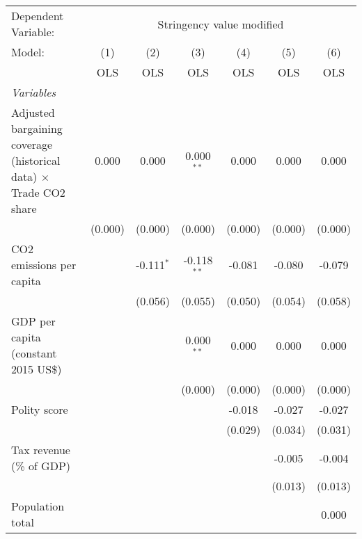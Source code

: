 
\begingroup
\centering
\begin{tabular}{lcccccc}
   \toprule
   Dependent Variable: & \multicolumn{6}{c}{Stringency value modified}\\
   Model:                                                                   & (1)     & (2)          & (3)           & (4)     & (5)     & (6)\\  
                                                                            &  OLS    & OLS          & OLS           & OLS     & OLS     & OLS\\  
   \midrule
   \emph{Variables}\\
   Adjusted bargaining coverage (historical data) $\times$ Trade CO2 share  & 0.000   & 0.000        & 0.000$^{**}$  & 0.000   & 0.000   & 0.000\\   
                                                                            & (0.000) & (0.000)      & (0.000)       & (0.000) & (0.000) & (0.000)\\   
   CO2 emissions per capita                                                 &         & -0.111$^{*}$ & -0.118$^{**}$ & -0.081  & -0.080  & -0.079\\   
                                                                            &         & (0.056)      & (0.055)       & (0.050) & (0.054) & (0.058)\\   
   GDP per capita (constant 2015 US\$)                                      &         &              & 0.000$^{**}$  & 0.000   & 0.000   & 0.000\\   
                                                                            &         &              & (0.000)       & (0.000) & (0.000) & (0.000)\\   
   Polity score                                                             &         &              &               & -0.018  & -0.027  & -0.027\\   
                                                                            &         &              &               & (0.029) & (0.034) & (0.031)\\   
   Tax revenue (\% of GDP)                                                  &         &              &               &         & -0.005  & -0.004\\   
                                                                            &         &              &               &         & (0.013) & (0.013)\\   
   Population total                                                         &         &              &               &         &         & 0.000\\   

\end{tabular}
